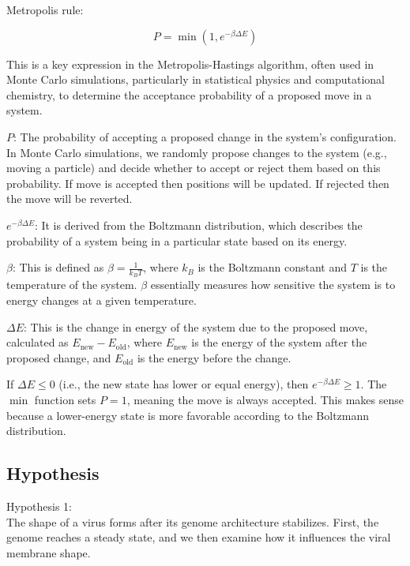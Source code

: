 \documentclass[12pt]{article}
\begin{document}
\begin{flushleft}
Metropolis rule:

\begin{equation}
P = \min\left(1, e^{-\beta \Delta E}\right)
\end{equation}

This is a key expression in the Metropolis-Hastings algorithm, often used in Monte Carlo simulations, particularly in statistical physics and computational chemistry, to determine the acceptance probability of a proposed move in a system.


\noindent $P$: The probability of accepting a proposed change in the system's configuration. In Monte Carlo simulations, we randomly propose changes to the system (e.g., moving a particle) and decide whether to accept or reject them based on this probability. If move is accepted then positions will be updated. If rejected then the move will be reverted.

\noindent $e^{-\beta \Delta E}$: It is derived from the Boltzmann distribution, which describes the probability of a system being in a particular state based on its energy.

\noindent $\beta$: This is defined as $\beta = \frac{1}{k_B T}$, where $k_B$ is the Boltzmann constant and $T$ is the temperature of the system. $\beta$ essentially measures how sensitive the system is to energy changes at a given temperature.

\noindent $\Delta E$: This is the change in energy of the system due to the proposed move, calculated as $E_{\text{new}} - E_{\text{old}}$, where $E_{\text{new}}$ is the energy of the system after the proposed change, and $E_{\text{old}}$ is the energy before the change.


If $\Delta E \leq 0$ (i.e., the new state has lower or equal energy), then $e^{-\beta \Delta E} \geq 1$. The $\min$ function sets $P = 1$, meaning the move is always accepted. This makes sense because a lower-energy state is more favorable according to the Boltzmann distribution.




\subsection*{Hypothesis}

\noindent Hypothesis 1:\\
The shape of a virus forms after its genome architecture stabilizes. First, the genome reaches a steady state, and we then examine how it influences the viral membrane shape. 


\end{flushleft}
\end{document}
